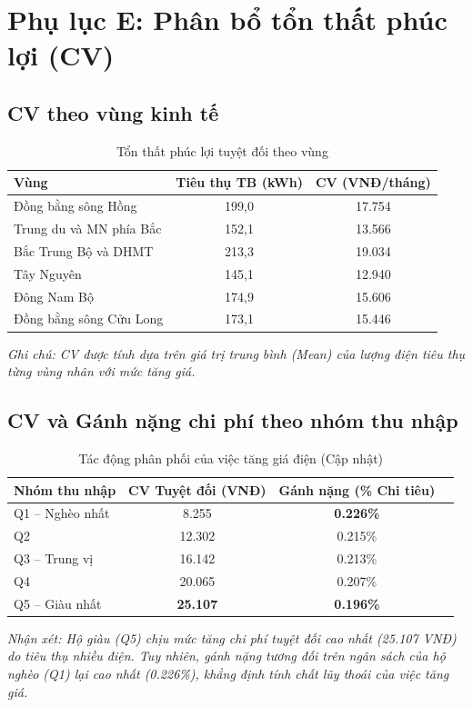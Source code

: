 \documentclass[12pt,a4paper,oneside]{article}
\begin{document}
\section{Phụ lục E: Phân bổ tổn thất phúc lợi (CV)}

\subsection{CV theo vùng kinh tế}
\begin{table}[H]
	\centering
	\caption{Tổn thất phúc lợi tuyệt đối theo vùng}
	\begin{tabular}{l c c}
		\toprule
		\textbf{Vùng} & \textbf{Tiêu thụ TB (kWh)} & \textbf{CV (VNĐ/tháng)} \\
		\midrule
		Đồng bằng sông Hồng & 199,0 & 17.754 \\
		Trung du và MN phía Bắc & 152,1 & 13.566 \\
		Bắc Trung Bộ và DHMT & 213,3 & 19.034 \\
		Tây Nguyên & 145,1 & 12.940 \\
		Đông Nam Bộ & 174,9 & 15.606 \\
		Đồng bằng sông Cửu Long & 173,1 & 15.446 \\
		\bottomrule
	\end{tabular}
	\footnotesize{\textit{Ghi chú: CV được tính dựa trên giá trị trung bình (Mean) của lượng điện tiêu thụ từng vùng nhân với mức tăng giá.}}
\end{table}

\subsection{CV và Gánh nặng chi phí theo nhóm thu nhập}
\begin{table}[H]
	\centering
	\caption{Tác động phân phối của việc tăng giá điện (Cập nhật)}
	\begin{tabular}{l c c c}
		\toprule
		\textbf{Nhóm thu nhập} & \textbf{CV Tuyệt đối (VNĐ)} & \textbf{Gánh nặng (\% Chi tiêu)} \\
		\midrule
		Q1 – Nghèo nhất & 8.255 & \textbf{0.226\%} \\
		Q2 & 12.302 & 0.215\% \\
		Q3 – Trung vị & 16.142 & 0.213\% \\
		Q4 & 20.065 & 0.207\% \\
		Q5 – Giàu nhất & \textbf{25.107} & \textbf{0.196\%} \\
		\bottomrule
	\end{tabular}
	\footnotesize{\textit{Nhận xét: Hộ giàu (Q5) chịu mức tăng chi phí tuyệt đối cao nhất (25.107 VNĐ) do tiêu thụ nhiều điện. Tuy nhiên, gánh nặng tương đối trên ngân sách của hộ nghèo (Q1) lại cao nhất (0.226\%), khẳng định tính chất lũy thoái của việc tăng giá.}}
\end{table}
\end{document}
